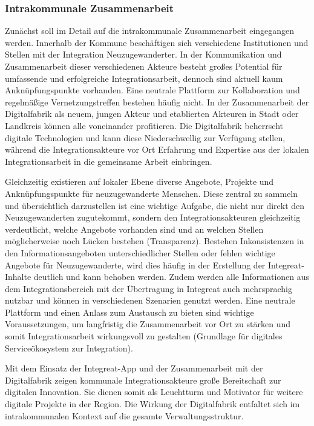 \documentclass[12pt, a4paper]{article} %
\begin{document}
\hypertarget{intrakommunale-zusammenarbeit}{%
\subsubsection{Intrakommunale Zusammenarbeit}\label{intrakommunale-zusammenarbeit}}

Zunächst soll im Detail auf die intrakommunale Zusammenarbeit
eingegangen werden. Innerhalb der Kommune beschäftigen sich verschiedene
Institutionen und Stellen mit der Integration Neuzugewanderter. In der
Kommunikation und Zusammenarbeit dieser verschiedenen Akteure besteht
großes Potential für umfassende und erfolgreiche Integrationsarbeit,
dennoch sind aktuell kaum Anknüpfungspunkte vorhanden. Eine neutrale
Plattform zur Kollaboration und regelmäßige Vernetzungstreffen bestehen
häufig nicht. In der Zusammenarbeit der Digitalfabrik als neuem, jungen
Akteur und etablierten Akteuren in Stadt oder Landkreis können alle
voneinander profitieren. Die Digitalfabrik beherrscht digitale
Technologien und kann diese Niederschwellig zur Verfügung stellen,
während die Integrationsakteure vor Ort Erfahrung und Expertise aus der
lokalen Integrationsarbeit in die gemeinsame Arbeit einbringen.

Gleichzeitig existieren auf lokaler Ebene diverse Angebote, Projekte und
Anknüpfungspunkte für neuzugewanderte Menschen. Diese zentral zu sammeln
und übersichtlich darzustellen ist eine wichtige Aufgabe, die nicht nur
direkt den Neuzugewanderten zugutekommt, sondern den
Integrationsakteuren gleichzeitig verdeutlicht, welche Angebote
vorhanden sind und an welchen Stellen möglicherweise noch Lücken
bestehen (Transparenz). Bestehen Inkonsistenzen in den
Informationsangeboten unterschiedlicher Stellen oder fehlen wichtige
Angebote für Neuzugewanderte, wird dies häufig in der Erstellung der
Integreat-Inhalte deutlich und kann behoben werden. Zudem werden alle
Informationen aus dem Integrationsbereich mit der Übertragung in
Integreat auch mehrsprachig nutzbar und können in verschiedenen
Szenarien genutzt werden. Eine neutrale Plattform und einen Anlass zum
Austausch zu bieten sind wichtige Voraussetzungen, um langfristig die
Zusammenarbeit vor Ort zu stärken und somit Integrationsarbeit
wirkungsvoll zu gestalten (Grundlage für digitales Serviceökosystem zur
Integration).

Mit dem Einsatz der Integreat-App und der Zusammenarbeit mit der
Digitalfabrik zeigen kommunale Integrationsakteure große Bereitschaft
zur digitalen Innovation. Sie dienen somit als Leuchtturm und Motivator
für weitere digitale Projekte in der Region. Die Wirkung der
Digitalfabrik entfaltet sich im intrakommunalen Kontext auf die gesamte
Verwaltungsstruktur.
\end{document}
